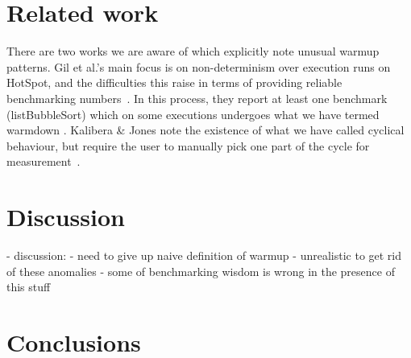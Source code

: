 \documentclass[a4paper,UKenglish]{lipics}
\newcommand{\kalibera}{Kalibera \& Jones\xspace}
\begin{document}
\section{Related work}

There are two works we are aware of which explicitly note unusual warmup
patterns. Gil et al.'s main focus is on non-determinism over execution runs on
HotSpot, and the difficulties this raise in terms of providing reliable
benchmarking numbers~\cite{gil11microbenchmark}. In this process, they report at
least one benchmark (listBubbleSort) which on some executions undergoes what we
have termed warmdown . \kalibera note the
existence of what we have called cyclical behaviour, but require the user to
manually pick one part of the cycle for measurement~\cite{kalibera13rigorous}.


\section{Discussion}
\label{sec:Discussion}

  - discussion:
    - need to give up naive definition of warmup
    - unrealistic to get rid of these anomalies
    - some of benchmarking wisdom is wrong in the presence of this stuff

\section{Conclusions}
\label{sec:conclusion}



\end{document}
